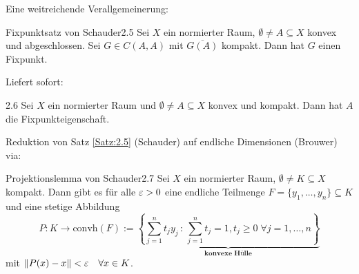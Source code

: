 \documentclass[a4paper]{article}
\begin{document}
Eine weitreichende Verallgemeinerung:

\begin{Satz}{Fixpunktsatz von Schauder}{2.5}
Sei $X$ ein normierter Raum, $\emptyset\ne A\subseteq X$ konvex und abgeschlossen. Sei $G\in C(A,A)$ mit $\overline{G(A)}$ kompakt. Dann hat $G$ einen Fixpunkt.
\end{Satz}

Liefert sofort:

\begin{Kor}{}{2.6}
Sei $X$ ein normierter Raum und $\emptyset\ne A\subseteq X$ konvex und kompakt. Dann hat $A$ die Fixpunkteigenschaft.
\end{Kor}

Reduktion von Satz \ref{Satz:2.5} (Schauder) auf endliche Dimensionen (Brouwer) via:
\begin{Lemma}{Projektionslemma von Schauder}{2.7}
Sei $X$ ein normierter Raum, $\emptyset\ne K\subseteq X$ kompakt. Dann gibt es für alle $\operatorname{\varepsilon}>0$ eine endliche Teilmenge $F=\{y_1,\ldots,y_n\}\subseteq K$ und eine stetige Abbildung
\[P\colon K\to \mathrm{convh}(F):=\underbrace{\left\{\sum_{j=1}^nt_jy_j\,:\,\sum_{j=1}^nt_j=1,t_j\ge0\;\forall j=1,\ldots,n\right\}}_{\textbf{konvexe Hülle}}\]
mit $\|P(x)-x\|<\operatorname{\varepsilon}\;\;\;\forall x\in K$.
\end{Lemma}
\end{document}

